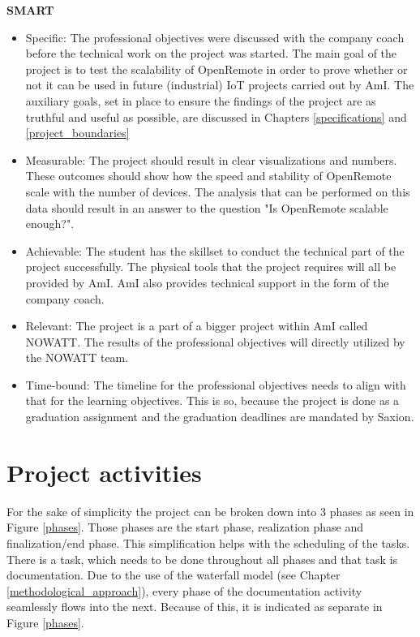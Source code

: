 \documentclass{report}
\begin{document}
	\textbf{SMART}
	\begin{itemize}
		\item Specific: The professional objectives were discussed with the company coach before the technical work on the project was started. The main goal of the project is to test the scalability of OpenRemote in order to prove whether or not it can be used in future (industrial) IoT projects carried out by AmI. The auxiliary goals, set in place to ensure the findings of the project are as truthful and useful as possible, are discussed in Chapters \ref{specifications} and \ref{project_boundaries}
		\item Measurable: The project should result in clear visualizations and numbers. These outcomes should show how the speed and stability of OpenRemote scale with the number of devices. The analysis that can be performed on this data should result in an answer to the question "Is OpenRemote scalable enough?".  
		\item Achievable: The student has the skillset to conduct the technical part of the project successfully. The physical tools that the project requires will all be provided by AmI. AmI also provides technical support in the form of the company coach.
		\item Relevant: The project is a part of a bigger project within AmI called NOWATT. The results of the professional objectives will directly utilized by the NOWATT team. 
		\item Time-bound: The timeline for the professional objectives needs to align with that for the learning objectives. This is so, because the project is done as a graduation assignment and the graduation deadlines are mandated by Saxion.
	\end{itemize}
	
	
	
	
	\chapter{Project activities}
	For the sake of simplicity the project can be broken down into 3 phases as seen in Figure \ref{phases}. Those phases are the start phase, realization phase and finalization/end phase. This simplification helps with the scheduling of the tasks. There is a task, which needs to be done throughout all phases and that task is documentation. Due to the use of the waterfall model (see Chapter \ref{methodological_approach}), every phase of the documentation activity seamlessly flows into the next. Because of this, it is indicated as separate in Figure \ref{phases}.
	
\end{document}
